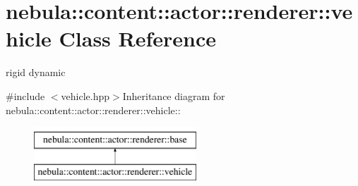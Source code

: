 \hypertarget{classnebula_1_1content_1_1actor_1_1renderer_1_1vehicle}{
\section{nebula::content::actor::renderer::vehicle Class Reference}
\label{classnebula_1_1content_1_1actor_1_1renderer_1_1vehicle}
}


rigid dynamic  


{\ttfamily \#include $<$vehicle.hpp$>$}Inheritance diagram for nebula::content::actor::renderer::vehicle::\begin{figure}[H]
\begin{center}
\leavevmode
\includegraphics[height=2cm]{classnebula_1_1content_1_1actor_1_1renderer_1_1vehicle}
\end{center}
\end{figure}
